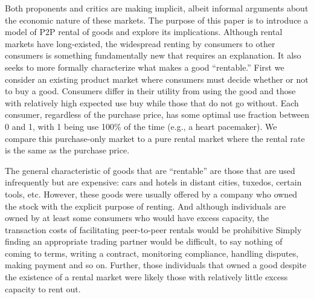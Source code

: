 \documentclass[11pt]{article}
\begin{document}
Both proponents and critics are making implicit, albeit informal arguments about the economic nature of these markets.  
The purpose of this paper is to introduce a model of P2P rental of goods and explore its implications.  
Although rental markets have long-existed, the widespread renting by consumers to other consumers is something fundamentally new that requires an explanation.  
It also seeks to more formally characterize what makes a good ``rentable.'' 
First we consider an existing product market where consumers must decide whether or not to buy a good.
Consumers differ in their utility from using the good and those with relatively high expected use buy while those that do not go without.
Each consumer, regardless of the purchase price, has some optimal use fraction between 0 and 1, with 1 being use 100\% of the time (e.g., a heart pacemaker). 
We compare this purchase-only market to a pure rental market where the rental rate is the same as the purchase price. 




The general characteristic of goods that are ``rentable'' are those that are used infrequently but are expensive: 
cars and hotels in distant cities, tuxedos, certain tools, etc.
However, these goods were usually offered by a company who owned the stock with the explicit purpose of renting.  
And although individuals are owned by at least some consumers who would have excess capacity, the transaction costs of facilitating peer-to-peer rentals would be prohibitive
Simply finding an appropriate trading partner would be difficult, to say nothing of coming to terms, writing a contract, monitoring compliance, handling disputes, making payment and so on. 
Further, those individuals that owned a good despite the existence of a rental market were likely those with relatively little excess capacity to rent out. 
\end{document}

